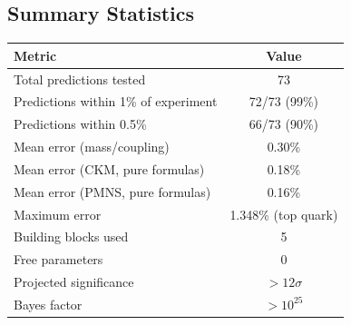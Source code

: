 \subsection{Summary Statistics}\label{app:summary_stats}

\begin{center}
\begin{tabular}{lc}
\hline\hline
Metric & Value \\
\hline
Total predictions tested & 73 \\
Predictions within 1\% of experiment & 72/73 (99\%) \\
Predictions within 0.5\% & 66/73 (90\%) \\
Mean error (mass/coupling) & 0.30\% \\
Mean error (CKM, pure formulas) & 0.18\% \\
Mean error (PMNS, pure formulas) & 0.16\% \\
Maximum error & 1.348\% (top quark) \\
Building blocks used & 5 \\
Free parameters & 0 \\
Projected significance & $> 12\sigma$ \\
Bayes factor & $> 10^{25}$ \\
\hline\hline
\end{tabular}
\end{center}

